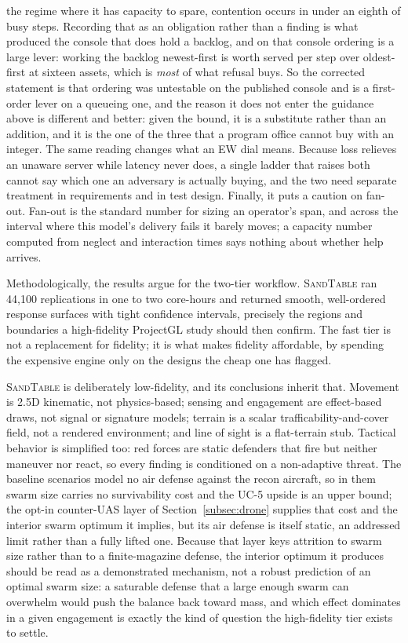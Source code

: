 \documentclass[11pt]{article}
\newcommand{\sandtable}{\textsc{SandTable}}
\begin{document}
the regime where it has capacity to spare, contention occurs in under an eighth of busy steps. Recording that as an obligation rather than a finding is what produced the console that does hold a backlog, and on that console ordering is a large lever: working the backlog newest-first is worth \LvLifoGain{} served per step over oldest-first at sixteen assets, which is \emph{most} of what refusal buys. So the corrected statement is that ordering was untestable on the published console and is a first-order lever on a queueing one, and the reason it does not enter the guidance above is different and better: given the bound, it is a substitute rather than an addition, and it is the one of the three that a program office cannot buy with an integer. The same reading changes what an EW dial means. Because loss relieves an unaware server while latency never does, a single ladder that raises both cannot say which one an adversary is actually buying, and the two need separate treatment in requirements and in test design. Finally, it puts a caution on fan-out. Fan-out is the standard number for sizing an operator's span, and across the interval where this model's delivery fails it barely moves; a capacity number computed from neglect and interaction times says nothing about whether help arrives.

Methodologically, the results argue for the two-tier workflow. \sandtable{} ran 44,100 replications in one to two core-hours and returned smooth, well-ordered response surfaces with tight confidence intervals, precisely the regions and boundaries a high-fidelity ProjectGL study should then confirm. The fast tier is not a replacement for fidelity; it is what makes fidelity affordable, by spending the expensive engine only on the designs the cheap one has flagged.


\sandtable{} is deliberately low-fidelity, and its conclusions inherit that. Movement is 2.5D kinematic, not physics-based; sensing and engagement are effect-based draws, not signal or signature models; terrain is a scalar trafficability-and-cover field, not a rendered environment; and line of sight is a flat-terrain stub. Tactical behavior is simplified too: red forces are static defenders that fire but neither maneuver nor react, so every finding is conditioned on a non-adaptive threat. The baseline scenarios model no air defense against the recon aircraft, so in them swarm size carries no survivability cost and the UC-5 upside is an upper bound; the opt-in counter-UAS layer of Section~\ref{subsec:drone} supplies that cost and the interior swarm optimum it implies, but its air defense is itself static, an addressed limit rather than a fully lifted one. Because that layer keys attrition to swarm size rather than to a finite-magazine defense, the interior optimum it produces should be read as a demonstrated mechanism, not a robust prediction of an optimal swarm size: a saturable defense that a large enough swarm can overwhelm would push the balance back toward mass, and which effect dominates in a given engagement is exactly the kind of question the high-fidelity tier exists to settle.
\end{document}
